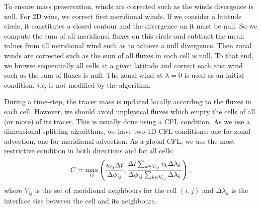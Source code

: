 To ensure mass preservation, winds are corrected such as the winds divergence is
null. For 2D wins, we correct first meridional winds. If we consider a latitude
circle, it constitutes a closed contour and the divergence on it must be null.
So we compute the sum of all meridional fluxes on this circle and subtract the
mean values from all meridional wind such as to achieve a null divergence. Then
zonal winds are corrected such as the sum of all fluxes in each cell is null. To
that end, we browse sequentially all cells at a given latitude and correct each
east wind such as the sum of fluxes is null. The zonal wind at $\lambda=0$ is
used as an initial condition, \textit{i.e}, is not modified by the algorithm.

During a time-step, the tracer mass is updated locally according to the fluxes
in each cell. However, we should avoid unphysical fluxes which empty the
cells of all (or more) of its tracer. This is usually done using a \gls{CFL}
condition. As we use a dimensional splitting algorithms, we have two 1D
\gls{CFL} conditions: one for zonal advection, one for meridional advection. As
a global \gls{CFL}, we use the most restrictive condition in both directions and
for all cells:
\begin{align*} 
  C = \max_{ij} \left(\frac{u_{ij}\Delta t}{\Delta\phi_{ij}},
  \frac{\Delta t\sum_{k \in V_{ij}} v_k \Delta\lambda_k }{%
    \Delta\phi_{ij}\sum_{k \in V_{ij}} \Delta\lambda_{k}} \right),
\end{align*}
where $V_{ij}$ is the set of meridional neighbours for the cell
$(i,j)$ and $\Delta\lambda_k$ is the interface size between the
cell and its neighbours.
 
